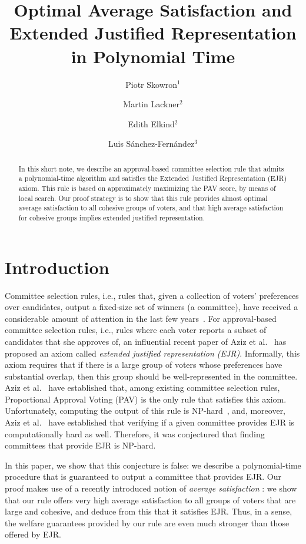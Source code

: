\documentclass[envcountsame]{llncs}
\title{Optimal Average Satisfaction 
and Extended Justified Representation in Polynomial Time}
\author{Piotr Skowron$^1$ \and Martin Lackner$^2$ \and Edith Elkind$^2$ \and Luis S\'anchez-Fern\'andez$^3$}
\institute{$^1$TU Berlin, Germany \quad $^2$University of Oxford, UK \\ $^3$Universidad Carlos III de Madrid, Spain}
\begin{document}
\maketitle
\thispagestyle{plain}


\begin{abstract}
In this short note, we describe an approval-based committee selection rule 
that admits a polynomial-time algorithm and satisfies the Extended Justified Representation (EJR)
axiom. This rule is based on approximately maximizing the PAV score, by means of local search.
Our proof strategy is to show that
this rule provides almost optimal average satisfaction to all cohesive groups of voters, 
and that high average satisfaction for cohesive groups implies extended justified representation.
\end{abstract}

\section{Introduction}
Committee selection rules, i.e., rules that, given a collection of voters' preferences over candidates,
output a fixed-size set of winners (a committee), have received a considerable amount of attention in the last 
few years~\cite{FSST-trends}. For approval-based committee selection rules, i.e., rules where
each voter reports a subset of candidates that she approves of, an influential recent paper of 
Aziz et al.~\cite{aziz:scw} has proposed an axiom called {\em extended justified representation (EJR)}.
Informally, this axiom requires that if there is a large group of voters whose preferences
have  substantial overlap, then this group should be well-represented in the committee.
Aziz et al.~\cite{aziz:scw} have established that, among existing committee selection rules, 
Proportional Approval Voting (PAV) is the only rule that satisfies this axiom. Unfortunately, 
computing the output of this rule is NP-hard~\cite{AGG+14a}, and, moreover, Aziz et al.~\cite{aziz:scw}
have established that verifying if a given committee provides EJR is computationally hard as well.
Therefore, it was conjectured that finding committees that provide EJR is NP-hard.

In this paper, we show that this conjecture is false: we describe a polynomial-time procedure
that is guaranteed to output a committee that provides EJR. Our proof makes use of a recently introduced
notion of {\em average satisfaction} \cite{aaai/SEL17-pjr,DBLP:journals/corr/SkowronLBPE16}: we show that our rule offers
very high average satisfaction to all groups of voters that are large and cohesive, and deduce
from this that it satisfies EJR. Thus, in a sense, the welfare guarantees provided by our rule
are even much stronger than those offered by EJR.
\end{document}
